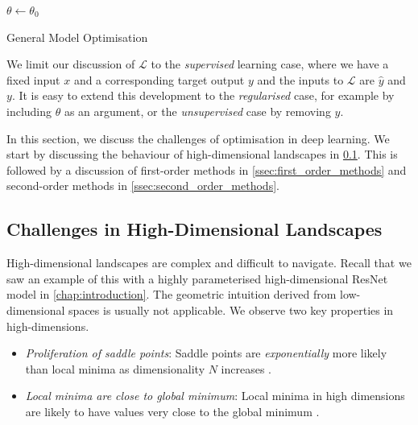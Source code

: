 \begin{algorithm}[H]
    \DontPrintSemicolon
    $\theta \leftarrow \theta_0$\;
    \Return{$\theta$}
    \caption{General Model Optimisation}
    \label{alg:general_deep_learning_algo}
\end{algorithm}


We limit our discussion of $\mathcal{L}$ to the \textit{supervised} learning case, where we have a fixed input $x$ and a corresponding target output $y$ and the inputs to $\mathcal{L}$ are $\hat{y}$ and $y$. It is easy to extend this development to the \textit{regularised} case, for example by including $\theta$ as an argument, or the \textit{unsupervised} case by removing $y$. 

In this section, we discuss the challenges of optimisation in deep learning. We start by discussing the behaviour of high-dimensional landscapes in \cref{ssec:dl_challenges}. This is followed by a discussion of first-order methods in \cref{ssec:first_order_methods} and second-order methods in \cref{ssec:second_order_methods}.

\subsection{Challenges in High-Dimensional Landscapes}
\label{ssec:dl_challenges}

High-dimensional landscapes are complex and difficult to navigate. Recall that we saw an example of this with a highly parameterised high-dimensional ResNet model in \cref{chap:introduction}. The geometric intuition derived from low-dimensional spaces is usually not applicable. We observe two key properties in high-dimensions.
\begin{itemize}
    \item \textit{Proliferation of saddle points}: Saddle points are \textit{exponentially} more likely than local minima as dimensionality $N$ increases \citep{dauphin2014sfn}.
    \item \textit{Local minima are close to global minimum}: Local minima in high dimensions are likely to have values very close to the global minimum \citep{dauphin2014sfn,choromanska2015loss}.
\end{itemize}

